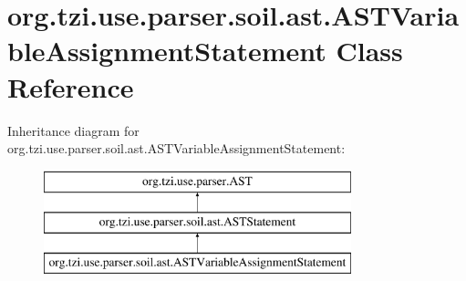 \hypertarget{classorg_1_1tzi_1_1use_1_1parser_1_1soil_1_1ast_1_1_a_s_t_variable_assignment_statement}{\section{org.\-tzi.\-use.\-parser.\-soil.\-ast.\-A\-S\-T\-Variable\-Assignment\-Statement Class Reference}
\label{classorg_1_1tzi_1_1use_1_1parser_1_1soil_1_1ast_1_1_a_s_t_variable_assignment_statement}
}
Inheritance diagram for org.\-tzi.\-use.\-parser.\-soil.\-ast.\-A\-S\-T\-Variable\-Assignment\-Statement\-:\begin{figure}[H]
\begin{center}
\leavevmode
\includegraphics[height=3.000000cm]{classorg_1_1tzi_1_1use_1_1parser_1_1soil_1_1ast_1_1_a_s_t_variable_assignment_statement}
\end{center}
\end{figure}
